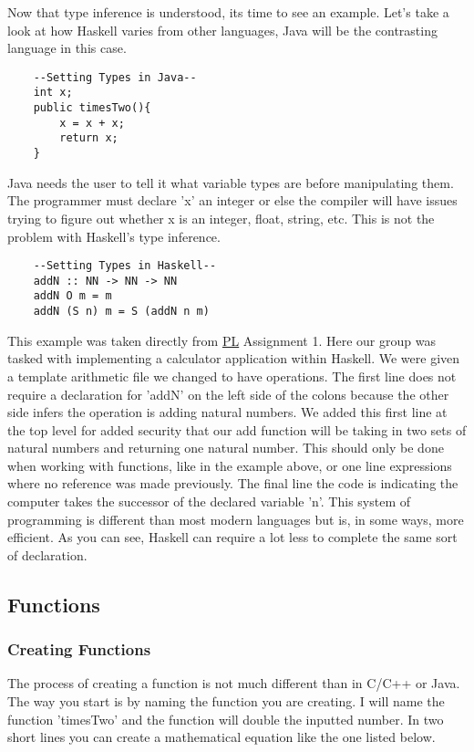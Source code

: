 \documentclass{article}
\begin{document}
    \medskip\noindent Now that type inference is understood, its time to see an example. Let's take a look at how Haskell varies from other languages, Java will be the contrasting language in this case.
    \begin{lstlisting}
    --Setting Types in Java--
    int x;
    public timesTwo(){
        x = x + x;
        return x;
    }
    \end{lstlisting}
    
    \medskip
    Java needs the user to tell it what variable types are before manipulating them. The programmer must declare 'x' an integer or else the compiler will have issues trying to figure out whether x is an integer, float, string, etc. This is not the problem with Haskell's type inference.
    
    \begin{lstlisting}
    --Setting Types in Haskell--
    addN :: NN -> NN -> NN
    addN O m = m
    addN (S n) m = S (addN n m)
    \end{lstlisting}
    
    \noindent This example was taken directly from \href{PL}{PL} Assignment 1. Here our group was tasked with implementing a calculator application within Haskell. We were given a template arithmetic file we changed to have operations. The first line does not require a declaration for 'addN' on the left side of the colons because the other side infers the operation is adding natural numbers. We added this first line at the top level for added security that our add function will be taking in two sets of natural numbers and returning one natural number. This should only be done when working with functions, like in the example above, or one line expressions where no reference was made previously. The final line the code is indicating the computer takes the successor of the declared variable 'n'. This system of programming is different than most modern languages but is, in some ways, more efficient. As you can see, Haskell can require a lot less to complete the same sort of declaration.
    
\subsection{Functions}
    
    \subsubsection{Creating Functions}
    The process of creating a function is not much different than in C/C++ or Java. The way you start is by naming the function you are creating. I will name the function 'timesTwo' and the function will double the inputted number. In two short lines you can create a mathematical equation like the one listed below. 
    
\end{document}
